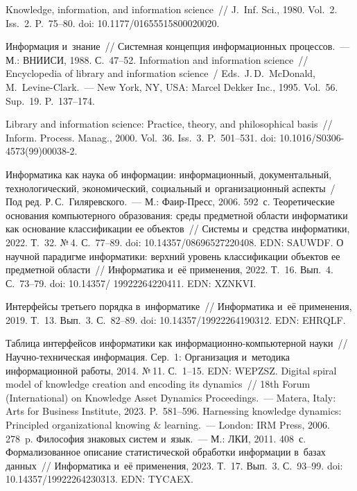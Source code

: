 \begin{multicols}{2}
{{\begin{thebibliography}{99}
 Knowledge, information, and information science~// J.~Inf. Sci., 
1980. Vol.~2. Iss.~2. P.~75--80. doi: 10.1177/01655515800020020.

 Информация и~знание~// Системная концепция информационных 
процессов.~--- М.: ВНИИСИ, 1988. С.~47--52.
 Information and information science~// Encyclopedia of library and 
information science~/ Eds.\ J.\,D.~McDonald, M.~Levine-Clark.~--- New York, NY, USA: Marcel Dekker Inc., 1995.   Vol.~56. Sup.~19.
P.~137--174.

 Library and information science: Practice, theory, and philosophical basis~// 
Inform. Process. Manag., 2000. Vol.~36. Iss.~3. P.~501--531. doi: 10.1016/S0306-4573(99)00038-2.

Информатика как наука об информации: информационный, документальный, 
технологический, экономический, социальный и~организационный аспекты~/ Под ред. 
Р.\,С.~Гиляревского.~--- М.: Фаир-Пресс, 2006. 592~с.
 Теоретические основания компьютерного образования: среды 
предметной области информатики как основание классификации ее объектов~// Системы 
и~средства информатики, 2022. Т.~32. №\,4. С.~77--89. doi: 10.14357/08696527220408. EDN: 
SAUWDF.
 О научной парадигме информатики: верхний уровень классификации объектов ее 
предметной об\-ласти~// Информатика и~её применения, 2022. Т.~16. Вып.~4. С.~73--79. doi: 
10.14357/ 19922264220411. EDN: \mbox{XZNKVI}.

 Интерфейсы третьего порядка в~информатике~// Информатика и~её применения, 
2019. Т.~13. Вып.~3. С.~82--89. doi: 10.14357/19922264190312. EDN: EHRQLF.

 Таблица интерфейсов информатики как  
ин\-фор\-ма\-ци\-он\-но-компью\-тер\-ной науки~// На\-уч\-но-тех\-ни\-че\-ская информация. 
Сер.~1: Организация и~методика информационной работы, 2014. №\,11. С.~1--15. EDN: 
WEPZSZ.
 Digital spiral model of knowledge creation and encoding its dynamics~// 18th 
Forum (International) on Knowledge Asset Dynamics Proceedings.~--- Matera, Italy: Arts for 
Business Institute, 2023. P.~581--596.
 Harnessing knowledge dynamics: Principled organizational knowing \& 
learning.~--- London: IRM Press, 2006. 278~p.
 Философия знаковых систем и~язык.~--- М.: ЛКИ, 2011. 408~с.
 Формализованное описание статистической обработки 
информации в~базах данных~// Информатика и~её применения, 2023. Т.~17. Вып.~3.  
С.~93--99. doi: 10.14357/19922264230313. EDN: TYCAEX.
\end{thebibliography}

 }
 }

\end{multicols}

